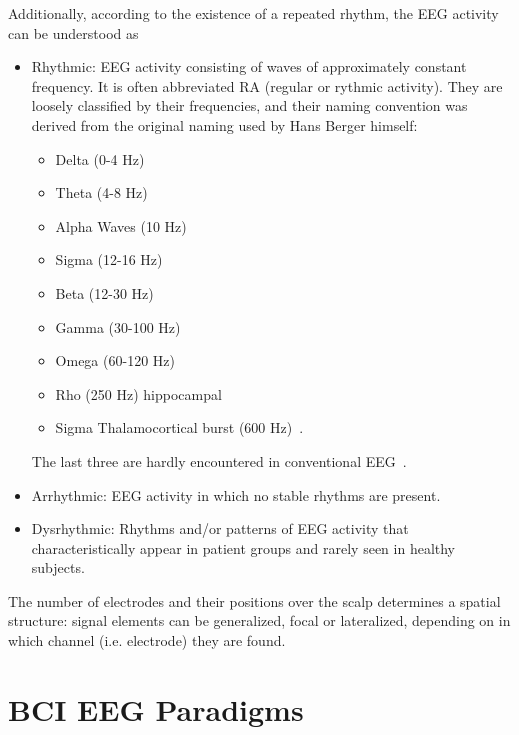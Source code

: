 \noindent Additionally, according to the existence of a repeated rhythm, the EEG activity can be understood as

\begin{itemize}
\item Rhythmic: EEG activity consisting of waves of approximately constant frequency.  It is often abbreviated RA (regular or rythmic activity). They are loosely classified by their frequencies, and their naming convention was derived from the original naming used by Hans Berger himself:

\begin{itemize}
\item Delta (0-4 Hz)
\item Theta (4-8 Hz)
\item Alpha Waves (10 Hz)
\item Sigma (12-16 Hz)
\item Beta (12-30 Hz)
\item Gamma (30-100 Hz)
\item Omega (60-120 Hz)
\item Rho (250 Hz) hippocampal
\item Sigma Thalamocortical burst (600 Hz)~\cite{Fedele2012}.
\end{itemize}

The last three are hardly encountered in conventional EEG~\cite{Vanhatalo2005}. 

\item Arrhythmic: EEG activity in which no stable rhythms are present.  
\item Dysrhythmic: Rhythms and/or patterns of EEG activity that characteristically appear in patient groups and rarely seen in healthy subjects.
\end{itemize}

The number of electrodes and their positions over the scalp determines a spatial structure: signal elements can be generalized, focal or lateralized, depending on in which channel (i.e. electrode) they are found.



\section{BCI EEG Paradigms}


